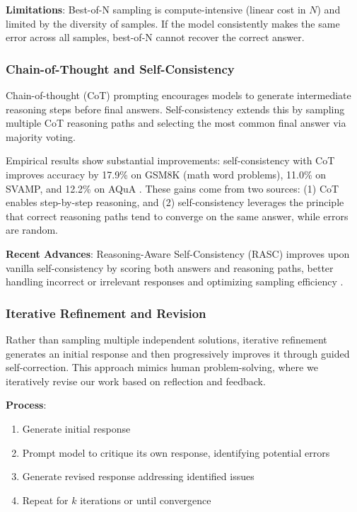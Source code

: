 \textbf{Limitations}: Best-of-N sampling is compute-intensive (linear cost in $N$) and limited by the diversity of samples. If the model consistently makes the same error across all samples, best-of-N cannot recover the correct answer.

\subsubsection{Chain-of-Thought and Self-Consistency}

Chain-of-thought (CoT) prompting \citep{wei2022cot} encourages models to generate intermediate reasoning steps before final answers. Self-consistency \citep{wang2023selfconsistency} extends this by sampling multiple CoT reasoning paths and selecting the most common final answer via majority voting.

Empirical results show substantial improvements: self-consistency with CoT improves accuracy by 17.9\% on GSM8K (math word problems), 11.0\% on SVAMP, and 12.2\% on AQuA \citep{wang2023selfconsistency}. These gains come from two sources: (1) CoT enables step-by-step reasoning, and (2) self-consistency leverages the principle that correct reasoning paths tend to converge on the same answer, while errors are random.

\textbf{Recent Advances}: Reasoning-Aware Self-Consistency (RASC) improves upon vanilla self-consistency by scoring both answers and reasoning paths, better handling incorrect or irrelevant responses and optimizing sampling efficiency \citep{rasc2024}.

\subsubsection{Iterative Refinement and Revision}

Rather than sampling multiple independent solutions, iterative refinement generates an initial response and then progressively improves it through guided self-correction. This approach mimics human problem-solving, where we iteratively revise our work based on reflection and feedback.

\textbf{Process}: 
\begin{enumerate}
    \item Generate initial response
    \item Prompt model to critique its own response, identifying potential errors
    \item Generate revised response addressing identified issues
    \item Repeat for $k$ iterations or until convergence
\end{enumerate}

